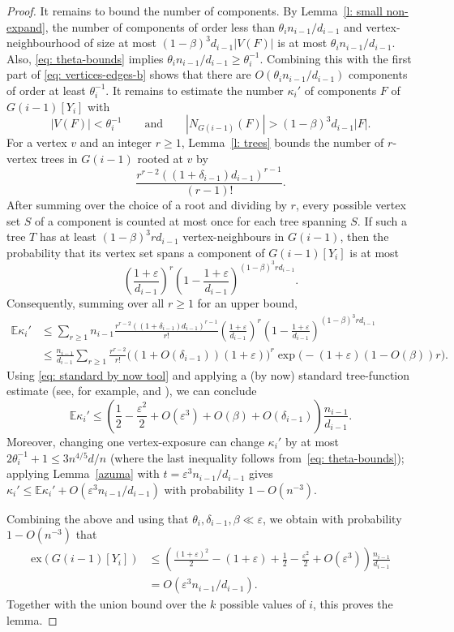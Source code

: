 \documentclass[reqno,a4paper]{amsart}
\theoremstyle{definition}
\newcommand{\eps}{\varepsilon}
\newcommand{\ex}{\mathrm{ex}}
\begin{document}
\begin{proof}
It remains to bound the number of components. By Lemma~\ref{l: small non-expand}, the number of components of order less than $\theta_{i} n_{i-1}/d_{i-1}$ and vertex-neighbourhood of size at most $(1-\beta)^3d_{i-1}|V(F)|$ is at most $\theta_i n_{i-1}/d_{i-1}$.
Also, \eqref{eq: theta-bounds} implies $\theta_i n_{i-1}/d_{i-1}\ge \theta_i^{-1}$. 
Combining this with the first part of \eqref{eq: vertices-edges-b} shows that there are $O(\theta_i n_{i-1}/d_{i-1})$ components of order at least $\theta_i^{-1}$. It remains to estimate the number $\kappa_i'$ of components $F$ of $G(i-1)[Y_i]$ with
\[
    |V(F)|<\theta_i^{-1}
    \qquad\text{and}\qquad
    |N_{G(i-1)}(F)|>(1-\beta)^3d_{i-1}|F|.
\]
For a vertex $v$ and an integer $r\ge1$, Lemma~\ref{l: trees} bounds the number of $r$-vertex trees in $G(i-1)$ rooted at $v$ by
\[
    \frac{r^{r-2}((1+\delta_{i-1})d_{i-1})^{r-1}}{(r-1)!}.
\]
After summing over the choice of a root and dividing by $r$, every possible vertex set $S$ of a component is counted at most once for each tree spanning $S$. If such a tree $T$ has at least $(1-\beta)^3rd_{i-1}$ vertex-neighbours in $G(i-1)$, then the probability that its vertex set spans a component of $G(i-1)[Y_i]$ is at most
\[
    \left(\frac{1+\eps}{d_{i-1}}\right)^r\left(1-\frac{1+\eps}{d_{i-1}}\right)^{(1-\beta)^3rd_{i-1}}.
\]
Consequently, summing over all $r\ge1$ for an upper bound,
\begin{align}
    \mathbb E\kappa_i'
    &\le \sum_{r\ge1} n_{i-1}\frac{r^{r-2}((1+\delta_{i-1})d_{i-1})^{r-1}}{r!}
    \left(\frac{1+\eps}{d_{i-1}}\right)^r\left(1-\frac{1+\eps}{d_{i-1}}\right)^{(1-\beta)^3rd_{i-1}}\nonumber \\
    &\le \frac{n_{i-1}}{d_{i-1}}\sum_{r\ge1}\frac{r^{r-2}}{r!}
    \big((1+O(\delta_{i-1}))(1+\eps)\big)^r
    \exp\big(-(1+\eps)(1-O(\beta))r\big).\label{eq: kappa-prime-expectation}
\end{align}
Using \eqref{eq: standard by now tool} and applying a (by now) standard tree-function estimate (see, for example, \cite[Section 5]{DK21} and \cite[p.~8]{FKM04}), we can conclude
\begin{equation}\label{eq: component-expansion-estimate}
    \mathbb E\kappa_i'
    \le \left(\frac12-\frac{\eps^2}{2}+O(\eps^3)+O(\beta)+O(\delta_{i-1})\right)\frac{n_{i-1}}{d_{i-1}}.
\end{equation}
Moreover, changing one vertex-exposure can change $\kappa_i'$ by at most $2\theta_i^{-1}+1\le 3n^{4/5}d/n$ (where the last inequality follows from~\eqref{eq: theta-bounds}); applying Lemma~\ref{azuma} with $t=\eps^3n_{i-1}/d_{i-1}$ gives $\kappa_i'\le \mathbb E\kappa_i'+O(\eps^3n_{i-1}/d_{i-1})$ with probability $1-O(n^{-3})$.

Combining the above and using that $\theta_i,\delta_{i-1},\beta\ll\eps$, we obtain with probability $1-O(n^{-3})$ that
\begin{align*}
    \ex(G(i-1)[Y_i])
    &\le \left(\frac{(1+\eps)^2}{2}-(1+\eps)+\frac12-\frac{\eps^2}{2}+O(\eps^3)\right)\frac{n_{i-1}}{d_{i-1}} \\
    &=O(\eps^3n_{i-1}/d_{i-1}).
\end{align*}
Together with the union bound over the $k$ possible values of $i$, this proves the lemma.
\end{proof}
\end{document}
